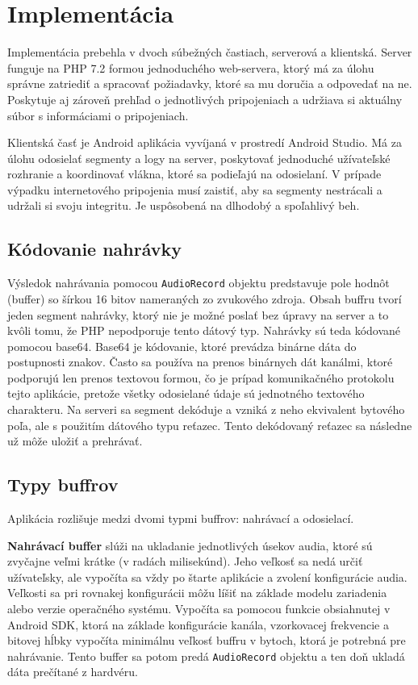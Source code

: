 \chapter{Implementácia}
\label{implementace}


Implementácia prebehla v dvoch súbežných častiach, serverová a klientská.
Server funguje na PHP 7.2 formou jednoduchého web-servera, ktorý má za úlohu správne zatriediť a spracovať požiadavky, ktoré sa mu doručia a odpovedať na ne. Poskytuje aj zároveň prehľad o jednotlivých pripojeniach a udržiava si aktuálny súbor s informáciami o pripojeniach. 

Klientská časť je Android aplikácia vyvíjaná v prostredí Android Studio\protect\footnotemark. Má za úlohu odosielať segmenty a logy na server, poskytovať jednoduché užívateľské rozhranie a koordinovať vlákna, ktoré sa podieľajú na odosielaní. V prípade výpadku internetového pripojenia musí zaistiť, aby sa segmenty nestrácali a udržali si svoju integritu. Je uspôsobená na dlhodobý a spoľahlivý beh.


\section{Kódovanie nahrávky}

Výsledok nahrávania pomocou \texttt{AudioRecord} objektu predstavuje pole hodnôt (buffer) so šírkou 16 bitov nameraných zo zvukového zdroja. Obsah buffru tvorí jeden segment nahrávky, ktorý nie je možné poslať bez úpravy na server a to kvôli tomu, že PHP nepodporuje tento dátový typ. Nahrávky sú teda kódované pomocou base64. Base64 je kódovanie, ktoré prevádza binárne dáta do postupnosti znakov. Často sa používa na prenos binárnych dát kanálmi, ktoré podporujú len prenos textovou formou, čo je prípad komunikačného protokolu tejto aplikácie, pretože všetky odosielané údaje sú jednotného textového charakteru. Na serveri sa segment dekóduje a vzniká z neho ekvivalent bytového poľa, ale s použitím dátového typu reťazec. Tento dekódovaný reťazec sa následne už môže uložiť a prehrávať.

\section*{Typy buffrov}
Aplikácia rozlišuje medzi dvomi typmi buffrov: nahrávací a odosielací.

\textbf{Nahrávací buffer} slúži na ukladanie jednotlivých úsekov audia, ktoré sú zvyčajne veľmi krátke (v radách milisekúnd). Jeho veľkosť sa nedá určiť užívateľsky, ale vypočíta sa vždy po štarte aplikácie a zvolení konfigurácie audia. Veľkosti sa pri rovnakej konfigurácii môžu líšiť na základe modelu zariadenia alebo verzie operačného systému. Vypočíta sa pomocou funkcie obsiahnutej v Android SDK, ktorá na základe konfigurácie kanála, vzorkovacej frekvencie a bitovej hĺbky vypočíta minimálnu veľkosť buffru v bytoch, ktorá je potrebná pre nahrávanie. Tento buffer sa potom predá \texttt{AudioRecord} objektu a ten doň ukladá dáta prečítané z hardvéru.

